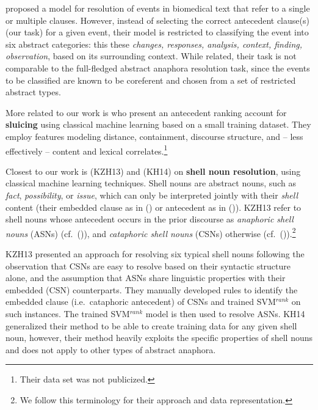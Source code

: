 \documentclass[11pt,letterpaper]{article}
\begin{document}
\citet{rajagopal2016unsupervised} proposed a model for resolution of events in biomedical text that refer to a single or multiple clauses.
However, instead of selecting the correct antecedent clause(s) (our task) for a given event, their model is restricted to classifying the event into six abstract categories: this these \textit{changes, responses, analysis, context, finding, observation}, based on its surrounding context. While related, their task is not comparable to the full-fledged abstract anaphora resolution task, since the events to be classified are known to be coreferent and chosen from a set of restricted abstract types.

More related to our work is \citet{anand-hardt:2016:EMNLP2016} who present an antecedent ranking account for {\bf sluicing} using classical machine learning based on a small training dataset. They employ features modeling distance, containment, discourse structure, and -- less effectively -- content and lexical correlates.\footnote{Their data set was not publicized.} 

Closest to our work is \citet{kolhatkar-zinsmeister-hirst:2013:EMNLP} (KZH13) and \citet{kolhatkar-hirst:2014:EMNLP2014} (KH14) on \textbf{shell noun resolution}, using classical machine learning techniques.
Shell nouns are abstract nouns, such as \textit{fact}, \textit{possibility}, or \textit{issue}, which can only be interpreted 
jointly 
with their \textit{shell} content (their embedded clause as in () or antecedent as in ()). 
KZH13 refer to shell nouns whose antecedent occurs in the prior discourse as \textit{anaphoric shell nouns} (ASNs) (cf.\ ()), and {\em cataphoric shell nouns} (CSNs) otherwise (cf.\ ()).\footnote{We follow this terminology for their approach and data representation.} 





KZH13 presented an approach for resolving six typical shell nouns following the observation that 
CSNs are easy to resolve based on their syntactic structure alone, and the assumption that ASNs share linguistic properties with their embedded (CSN) counterparts.
They manually developed rules to identify the embedded clause (i.e.\ cataphoric antecedent) of CSNs and trained SVM$^{rank}$ \cite{joachims2002optimizing} on such instances.
The trained SVM$^{rank}$ model is then used to resolve ASNs.  KH14 generalized their method to be able 
to create training data for any given shell noun, 
however, their method heavily exploits the specific properties of shell nouns and does not apply to other types of abstract anaphora. 
\end{document}
